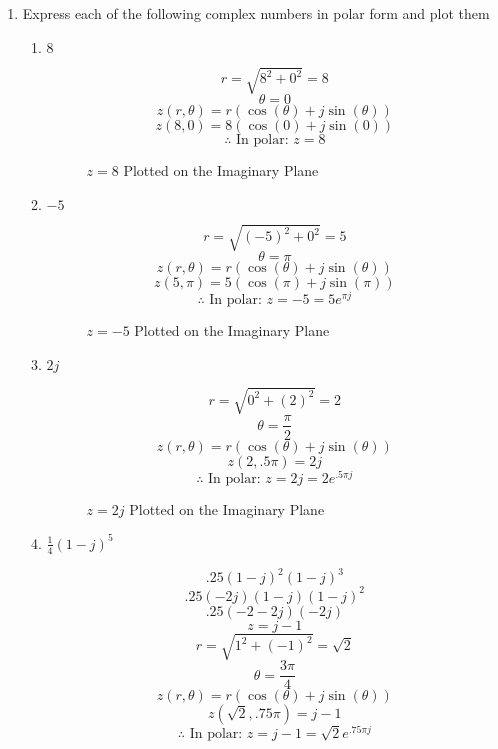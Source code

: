 \begin{enumerate}

  \item Express each of the following complex numbers in polar form and plot them

    \begin{enumerate}

      \item $8$

        $$r=\sqrt{8^2+0^2}=8$$
        $$\theta=0$$
        $$z(r,\theta)=r(\cos(\theta)+j\sin(\theta))$$
        $$z(8,0)=8(\cos(0)+j\sin(0))$$
        $$\therefore \text{ In polar: } \boxed{z=8}$$

        \begin{figure}[H]
          \centering
          
          \caption{$z=8$ Plotted on the Imaginary Plane}
          \label{fig:1}
        \end{figure}

      \item $-5$

        $$r=\sqrt{(-5)^2+0^2}=5$$
        $$\theta=\pi$$
        $$z(r,\theta)=r(\cos(\theta)+j\sin(\theta))$$
        $$z(5,\pi)=5(\cos(\pi)+j\sin(\pi))$$
        $$\therefore \text{ In polar: } \boxed{z=-5=5e^{\pi j}}$$

        \begin{figure}[H]
          \centering
          
          \caption{$z=-5$ Plotted on the Imaginary Plane}
          \label{fig:2}
        \end{figure}

      \item $2j$

        $$r=\sqrt{0^2+(2)^2}=2$$
        $$\theta=\frac{\pi}{2}$$
        $$z(r,\theta)=r(\cos(\theta)+j\sin(\theta))$$
        $$z(2,.5\pi)=2j$$
        $$\therefore \text{ In polar: } \boxed{z=2j=2e^{.5\pi j}}$$

        \begin{figure}[H]
          \centering
          
          \caption{$z=2j$ Plotted on the Imaginary Plane}
          \label{fig:3}
        \end{figure}

      \item $\frac{1}{4}(1-j)^5$

        $$.25(1-j)^2(1-j)^3$$
        $$.25(-2j)(1-j)(1-j)^2$$
        $$.25(-2-2j)(-2j)$$
        $$z=j-1$$
        $$r=\sqrt{1^2+(-1)^2}=\sqrt{2}$$
        $$\theta=\frac{3\pi}{4}$$
        $$z(r,\theta)=r(\cos(\theta)+j\sin(\theta))$$
        $$z(\sqrt{2},.75\pi)=j-1$$
        $$\therefore \text{ In polar: } \boxed{z=j-1=\sqrt{2}e^{.75\pi j}}$$


\end{enumerate}
\end{enumerate}
